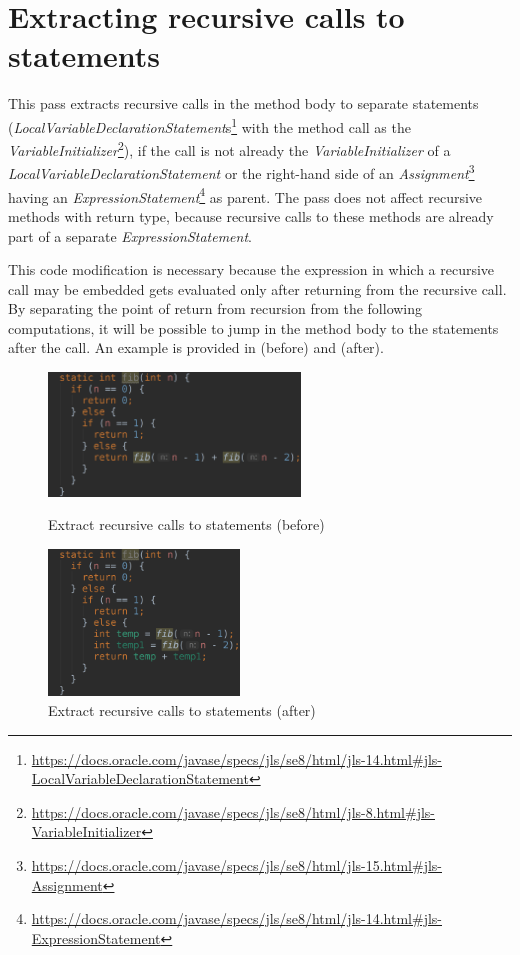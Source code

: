 \section{Extracting recursive calls to statements}

This pass extracts recursive calls in the method body to separate statements
(\textit{LocalVariableDeclarationStatement}s\footnote{\url{https://docs.oracle.com/javase/specs/jls/se8/html/jls-14.html#jls-LocalVariableDeclarationStatement}}
with the method call as the
\textit{VariableInitializer}\footnote{\url{https://docs.oracle.com/javase/specs/jls/se8/html/jls-8.html#jls-VariableInitializer}}),
if the call is not already the \textit{VariableInitializer} of a \textit{LocalVariableDeclarationStatement} or the
right-hand side of an \textit{Assignment}\footnote{\url{https://docs.oracle.com/javase/specs/jls/se8/html/jls-15.html#jls-Assignment}}
having an \textit{ExpressionStatement}\footnote{\url{https://docs.oracle.com/javase/specs/jls/se8/html/jls-14.html#jls-ExpressionStatement}}
as parent. The pass does not affect recursive methods with  return type, because recursive calls to these
methods are already part of a separate \textit{ExpressionStatement}.

This code modification is necessary because the expression in which a recursive call may be embedded gets evaluated
only after returning from the recursive call. By separating the point of return from recursion from the following
computations, it will be possible to jump in the method body to the statements after the call. An example is provided
in  (before) and  (after).

\begin{figure}[htb]
    \centering
    \begin{minipage}[b]{0.45\textwidth}
        \centering
        \includegraphics[height=1.3in]{src/img/extract-before.png}
        \caption{Extract recursive calls to \mbox{statements} (before) \label{img:extract-before}}
    \end{minipage}
    \hfill
    \begin{minipage}[b]{0.45\textwidth}
        \centering
        \includegraphics[height=1.536in]{src/img/extract-after.png}
        \caption{Extract recursive calls to statements (after) \label{img:extract-after}}
    \end{minipage}
\end{figure}